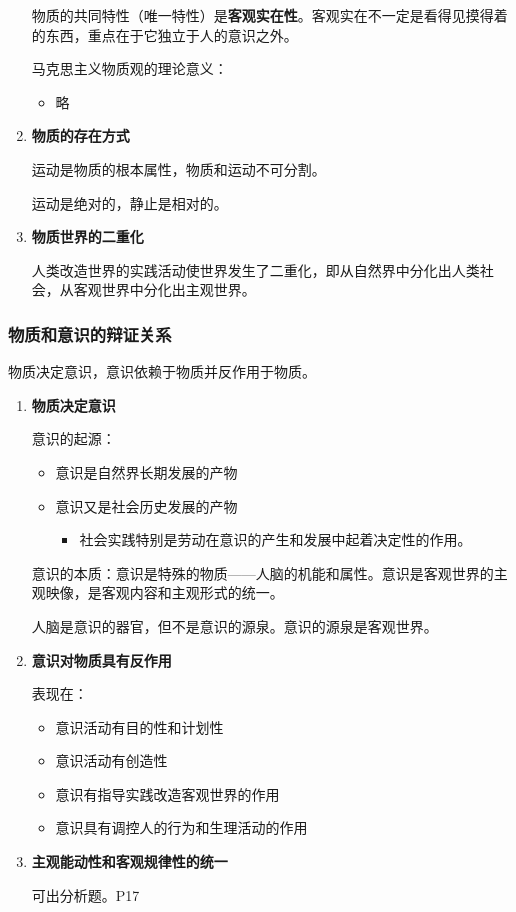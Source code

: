 \documentclass[12pt, a4paper, oneside]{ctexart}
\begin{document}
\begin{enumerate}
  物质的共同特性（唯一特性）是\textbf{客观实在性}。客观实在不一定是看得见摸得着的东西，重点在于它独立于人的意识之外。

  马克思主义物质观的理论意义：
  \begin{itemize}
    \item 略
  \end{itemize}

  \item {\bf 物质的存在方式}
  
  运动是物质的根本属性，物质和运动不可分割。

  运动是绝对的，静止是相对的。

  \item {\bf 物质世界的二重化}
  
  人类改造世界的实践活动使世界发生了二重化，即从自然界中分化出人类社会，从客观世界中分化出主观世界。
\end{enumerate}

\subsubsection{物质和意识的辩证关系}

物质决定意识，意识依赖于物质并反作用于物质。

\begin{enumerate}
  \item {\bf 物质决定意识}
  
  意识的起源：
  \begin{itemize}
    \item 意识是自然界长期发展的产物
    \item 意识又是社会历史发展的产物
    \begin{itemize}
      \item 社会实践特别是劳动在意识的产生和发展中起着决定性的作用。
    \end{itemize}
  \end{itemize}

  意识的本质：意识是特殊的物质——人脑的机能和属性。意识是客观世界的主观映像，是客观内容和主观形式的统一。

  人脑是意识的器官，但不是意识的源泉。意识的源泉是客观世界。

  \item {\bf 意识对物质具有反作用}
  
  表现在：
  \begin{itemize}
    \item 意识活动有目的性和计划性
    \item 意识活动有创造性
    \item 意识有指导实践改造客观世界的作用
    \item 意识具有调控人的行为和生理活动的作用
  \end{itemize}

  \item {\bf 主观能动性和客观规律性的统一}
  
  可出分析题。P17

\end{enumerate}
\end{document}
